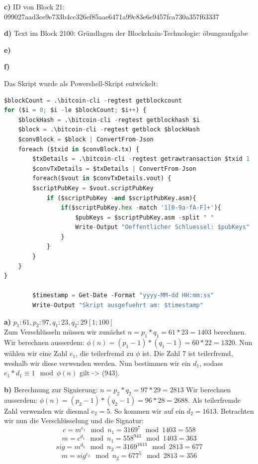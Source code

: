 \documentclass[german]{../uebung}
\begin{document}
\begin{exercise}{1}
    \textbf{c)}
    ID von Block 21: 099027aad3ce9e733b4cc326ef85aae6471a99c83e6e9457fca730a357f63337

    \textbf{d)}
    Text im Block 2100: Gründlagen der Blockchain-Technologie: öbungsaufgabe

    \textbf{e)}

    \textbf{f)}

    Das Skript wurde als Powershell-Skript entwickelt:
    \begin{lstlisting}[language=Python]
$blockCount = .\bitcoin-cli -regtest getblockcount
for ($i = 0; $i -le $blockCount; $i++) {
    $blockHash = .\bitcoin-cli -regtest getblockhash $i
    $block = .\bitcoin-cli -regtest getblock $blockHash
    $convBlock = $block | ConvertFrom-Json
    foreach ($txid in $convBlock.tx) {
        $txDetails = .\bitcoin-cli -regtest getrawtransaction $txid 1
        $convTxDetails = $txDetails | ConvertFrom-Json
        foreach($vout in $convTxDetails.vout) {
        $scriptPubKey = $vout.scriptPubKey
            if ($scriptPubKey -and $scriptPubKey.asm){
                if($scriptPubKey.hex -match '1[0-9a-fA-F]+'){
                    $pubKeys = $scriptPubKey.asm -split " "
                    Write-Output "Oeffentlicher Schluessel: $pubKeys"
                }
            }
        }
    }
}

        $timestamp = Get-Date -Format "yyyy-MM-dd HH:mm:ss"
        Write-Output "Skript ausgefuehrt am: $timestamp"


    \end{lstlisting}

\end{exercise}

\begin{exercise}{2}

    \textbf{a)}
    \(p_1: 61, p_2: 97, q_1: 23, q_2: 29 [1; 100]\)\\
    Zum Verschlüsseln müssen wir zunächst \(n=p_1*q_1=61*23=1403\) berechnen.
    Wir berechnen ausserdem: \(\phi(n)=(p_1-1)*(q_1-1)=60*22=1320\).
    Nun wählen wir eine Zahl \(e_1\), die teilerfremd zu \(\phi\) ist. Die Zahl 7 ist teilerfremd, weshalb wir diese verwenden werden.
    Nun bestimmen wir ein \(d_1\), sodass \(e_1*d_1 \equiv 1 \mod \phi(n) \) gilt -> (943).

    \textbf{b)}
    Berechnung zur Signierung: \(n=p_2*q_2=97*29=2813\)
    Wir berechnen ausserdem: \(\phi(n)=(p_2-1)*(q_2-1)=96*28=2688\). Als teilerfremde Zahl verwenden wir diesmal \(e_2=5\). So kommen wir auf ein \(d_2=1613\). Betrachten wir nun die Verschlüsselung und die Signatur:
    \[c=m^{e_1} \mod n_1=3169^7 \mod 1403= 558\]
    \[m=c^{d_1} \mod n_1=558^{943} \mod 1403= 363\]
    \[sig=m^{d_2} \mod n_2=3169^{1613} \mod 2813= 677\]
    \[m=sig^{e_2} \mod n_2=677^5 \mod 2813= 356\]

\end{exercise}
\end{document}
